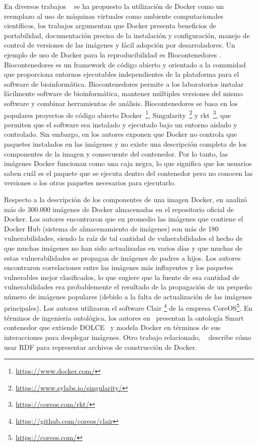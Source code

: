 En diversos trabajos ~\cite{DBLP:journals/bioinformatics/LeprevostGARUBV17, Beaulieu2017, Boettiger:2015:IDR:2723872.2723882, aranguren2015enhanced} se ha propuesto la utilización de Docker como un reemplazo al uso de máquinas virtuales como ambiente computacionales científicos, los trabajos argumentan que Docker presenta beneficios de portabilidad, documentación precisa de la instalación y configuración, manejo de control de versiones de las imágenes y fácil adopción por desarroladores. 
Un ejemplo de uso de Docker para la reproducibilidad es Biocontenedores \cite{DBLP:journals/bioinformatics/LeprevostGARUBV17}. Biocontenedores es un framework de código abierto y orientado a la comunidad que proporciona entornos ejecutables independientes de la plataforma para el software de bioinformática. Biocontenedores permite a los laboratorios instalar fácilmente software de bioinformática, mantener múltiples versiones del mismo software y combinar herramientas de análisis. Biocontenedores se basa en los populares proyectos de código abierto Docker~\footnote{\url{https://www.docker.com/}}, Singularity~\footnote{\url{https://www.sylabs.io/singularity/}} y rkt~\footnote{\url{https://coreos.com/rkt/}}, que permiten que el software sea instalado y ejecutado bajo un entorno aislado y controlado.
Sin embargo, en \cite{Boettiger:2015:IDR:2723872.2723882,DBLP:conf/semweb/OsorioAV18} los autores exponen que Docker no controla que paquetes instalados en las imágenes y no existe una descripción completa de los componentes de la imagen y consecuente del contenedor. Por lo tanto, las imágenes Docker funcionan como una caja negra, lo que significa que los usuarios saben cuál es el paquete que se ejecuta dentro del contenedor pero no conocen las versiones o los otros paquetes necesarios para ejecutarlo.

Respecto a la descripción de los componentes de una imagen Docker, en \cite{Shu:2017:SSV:3029806.3029832:DockerHub:Security} analizó más de 300.000 imágenes de Docker almacenadas en el repositorio oficial de Docker. Los autores encontraron que en promedio las imágenes que contiene el Docker Hub (sistema de almacenamiento de imágenes) son más de 180 vulnerabilidades, siendo la raíz de tal cantidad de vulnerabilidades el hecho de que muchas imágenes no han sido actualizadas en varios días y que muchas de estas vulnerabilidades se propagan de imágenes de padres a hijos. Los autores encontraron correlaciones entre las imágenes más influyentes y los paquetes vulnerables mejor clasificados, lo que sugiere que la fuente de esa cantidad de vulnerabilidades era probablemente el resultado de la propagación de un pequeño número de imágenes populares (debido a la falta de actualización de las imágenes principales). Los autores utilizaron el software Clair \footnote{\url{https://github.com/coreos/clair}} de la empresa CoreOS\footnote{\url{https://coreos.com/}}. 
En términos de ingeniería ontológica, los autores en~\cite{huo2015smart} presentan la ontología Smart contenedor que extiende DOLCE~\cite{gangemi2002sweetening} y modela Docker en términos de sus interacciones para desplegar imágenes. Otro trabajo relacionado, ~\cite{tommasini2017representing}  describe cómo usar RDF para representar archivos de construcción de Docker. 

